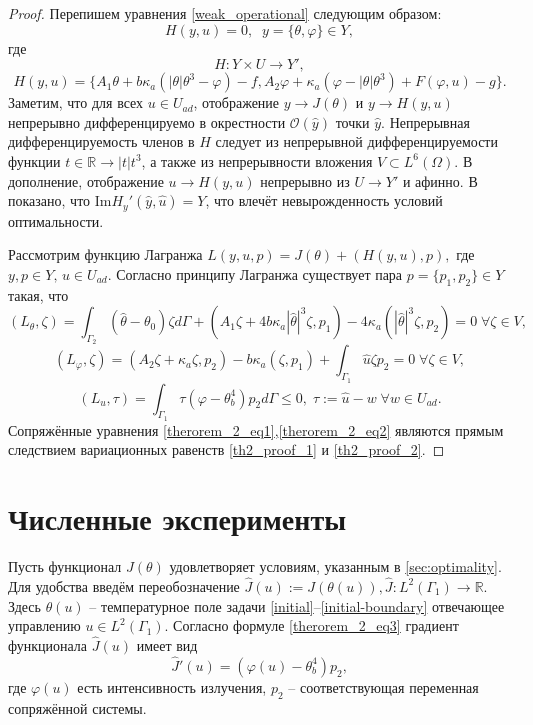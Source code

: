 \documentclass[10pt]{article}
\begin{document}
    \begin{proof}
        Перепишем уравнения \eqref{weak_operational} следующим образом:
        $$H(y,u) = 0,\;\; y = \{\theta,\varphi\} \in Y,$$
        где
        $$ H:Y \times U \to Y', $$
        $$H(y,u) =\{A_1 \theta + b \kappa_a (| \theta | \theta^3 - \varphi ) - f, A_2 \varphi + \kappa_a (\varphi - |\theta|\theta^3) + F(\varphi, u) - g \}.$$
        Заметим, что для всех $u \in U_{ad}$, отображение $y \to J(\theta) $ и $y \to H(y,u)$ непрерывно дифференцируемо в окрестности $\mathcal{O}(\hat{y})$ точки $\hat{y}$. Непрерывная дифференцируемость членов в $H$ следует из непрерывной дифференцируемости функции $t \in \mathbb{R} \to | t | t^3$, а также из непрерывности вложения  $V \subset L^6(\Omega)$.
        В дополнение, отображение $u \to H(y,u)$ непрерывно из $U \to Y'$ и афинно.
        В \cite{cheb_origin} показано, что $\text{Im}H_y'(\hat{y}, \hat{u}) = Y$, что влечёт невырожденность условий оптимальности.

        Рассмотрим функцию Лагранжа
        $L(y,u,p) = J(\theta) + (H(y,u),p),$
        где $y,p \in Y,\, u \in U_{ad}$. Согласно принципу Лагранжа \cite[Гл.2, Теорема 1.5]{theorem_proof_18} существует пара $p = \{p_1,p_2\} \in Y$ такая, что
        \begin{equation}
            \label{th2_proof_1}
            (L_\theta,\zeta) =\int_{\Gamma_2}(\hat\theta -\theta_0) \zeta d\Gamma + (A_1 \zeta + 4b\kappa_a |\hat\theta|^3 \zeta,p_1) - 4\kappa_a(|\hat\theta|^3 \zeta,p_2) = 0 \; \forall \zeta \in V,
        \end{equation}
        \begin{equation}
            \label{th2_proof_2}
            (L_\varphi, \zeta) = (A_2 \zeta + \kappa_a \zeta, p_2) - b \kappa_a(\zeta,p_1) +\int_{\Gamma_1} \hat u \zeta p_2 = 0 \; \forall \zeta \in V,
        \end{equation}
        \begin{equation}
            \label{th2_proof_3}
            (L_u,\tau) = \int_{\Gamma_1} \tau (\varphi - \theta^4_b) p_2 d\Gamma  \leq 0, \; \tau := \hat u - w \; \forall w \in U_{ad}.
        \end{equation}
        Сопряжённые уравнения \eqref{therorem_2_eq1},\eqref{therorem_2_eq2} являются прямым следствием
        вариационных равенств \eqref{th2_proof_1} и \eqref{th2_proof_2}.
    \end{proof}

    \section{Численные эксперименты}
    Пусть функционал $J(\theta)$ удовлетворяет условиям, указанным в \autoref{sec:optimality}. Для удобства введём переобозначение $\hat{J}(u):=J(\theta(u)), \hat{J}:L^2(\Gamma_1) \to \mathbb{R}$. Здесь $\theta(u)$ -- температурное поле задачи  \eqref{initial}--\eqref{initial-boundary} отвечающее управлению $u \in L^2(\Gamma_1)$.
    Согласно формуле \eqref{therorem_2_eq3} градиент функционала $\hat{J}(u)$ \cite{grenkin_13} имеет вид
    $$\hat{J}'(u)= (\varphi(u) -\theta_b^4)p_2,$$
    где $\varphi(u)$ есть интенсивность излучения, $p_2$ -- соответствующая переменная сопряжённой системы.
\end{document}
